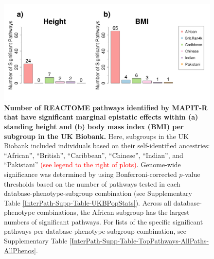 \documentclass[10pt]{article}
\begin{document}

\begin{figure}[htbp]
\centering
\includegraphics[width = \textwidth]{Images/Supp/InterPath_Supp_Figure_Barplots_REACTOME_vs4.png}
\caption{\textbf{Number of REACTOME pathways identified by MAPIT-R that have significant marginal epistatic effects within (a) standing height and (b) body mass index (BMI) per subgroup in the UK Biobank.} Here, subgroups in the UK Biobank included individuals based on their self-identified ancestries: ``African'', ``British'', ``Caribbean'', ``Chinese'', ``Indian'', and ``Pakistani'' \textcolor{red}{(see legend to the right of plots)}. Genome-wide significance was determined by using Bonferroni-corrected $p$-value thresholds based on the number of pathways tested in each database-phenotype-subgroup combination (see Supplementary Table \ref{InterPath-Supp-Table-UKBPopStats}). Across all database-phenotype combinations, the African subgroup has the largest numbers of significant pathways. For lists of the specific significant pathways per database-phenotype-subgroup combination, see Supplementary Table \ref{InterPath-Supp-Table-TopPathways-AllPaths-AllPhenos}.}
\label{InterPath-Supp-Figure-Barplots-REACTOME}
\end{figure}
\clearpage

\end{document}
